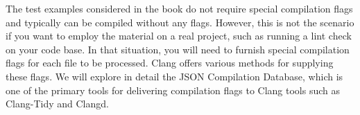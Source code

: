 The test examples considered in the book do not require special compilation flags and typically can be compiled without any flags. However, this is not the scenario if you want to employ the material on a real project, such as running a lint check on your code base. In that situation, you will need to furnish special compilation flags for each file to be processed. Clang offers various methods for supplying these flags. We will explore in detail the JSON Compilation Database, which is one of the primary tools for delivering compilation flags to Clang tools such as Clang-Tidy and Clangd.